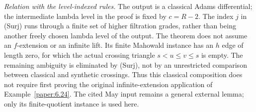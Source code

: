 \begin{theorem}
\textit{Relation with the level-indexed rules.}
The output is a classical Adams differential; the intermediate lambda
level in the proof is fixed by $c=R-2$. The index $j$ in (Surj)
runs through a finite set of higher filtration grades, rather than
being another freely chosen lambda level of the output.
The theorem does not assume an $f$-extension or an infinite lift.
Its finite Mahowald instance has an $h$ edge of length zero, for which
the actual crossing triangle $s<u\leq v\leq s$ is empty.
The remaining ambiguity is eliminated by (Surj), not by an
unrestricted comparison between classical and synthetic crossings.
Thus this classical composition does not require first proving the
original infinite-extension application of Example~\ref{paper:6.24}.
The cited May input remains a general external lemma; only its
finite-quotient instance is used here.
\end{theorem}
